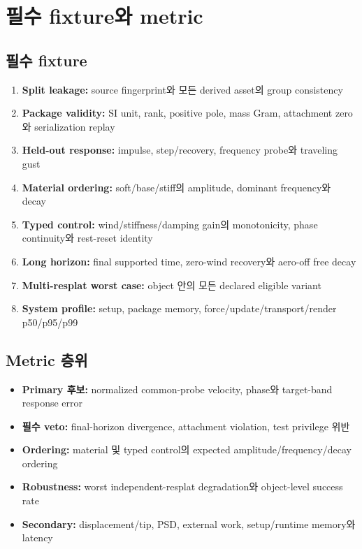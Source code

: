 \documentclass[10pt,a4paper]{article}
\begin{document}
\section{필수 fixture와 metric}
\label{sec:r4-chapter-7}

\subsection{필수 fixture}

\begin{enumerate}
  \item \textbf{Split leakage:} source fingerprint와 모든 derived asset의 group consistency
  \item \textbf{Package validity:} SI unit, rank, positive pole, mass Gram, attachment zero와 serialization replay
  \item \textbf{Held-out response:} impulse, step/recovery, frequency probe와 traveling gust
  \item \textbf{Material ordering:} soft/base/stiff의 amplitude, dominant frequency와 decay
  \item \textbf{Typed control:} wind/stiffness/damping gain의 monotonicity, phase continuity와 rest-reset identity
  \item \textbf{Long horizon:} final supported time, zero-wind recovery와 aero-off free decay
  \item \textbf{Multi-resplat worst case:} object 안의 모든 declared eligible variant
  \item \textbf{System profile:} setup, package memory, force/update/transport/render p50/p95/p99
\end{enumerate}

\subsection{Metric 층위}

\begin{itemize}
  \item \textbf{Primary 후보:} normalized common-probe velocity, phase와 target-band response error
  \item \textbf{필수 veto:} final-horizon divergence, attachment violation, test privilege 위반
  \item \textbf{Ordering:} material 및 typed control의 expected amplitude/frequency/decay ordering
  \item \textbf{Robustness:} worst independent-resplat degradation와 object-level success rate
  \item \textbf{Secondary:} displacement/tip, PSD, external work, setup/runtime memory와 latency
\end{itemize}
\end{document}
